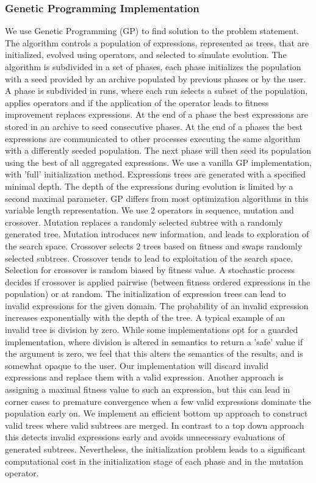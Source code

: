 \subsubsection{Genetic Programming Implementation}
We use Genetic Programming (GP) \cite{GP} to find solution to the problem statement. The algorithm controls a population of expressions, represented as trees, that are initialized, evolved using operators, and selected to simulate evolution.
The algorithm is subdivided in a set of phases, each phase initializes the population with a seed provided by an archive populated by previous phases or by the user. A phase is subdivided in runs, where each run selects a subset of the population, applies operators and if the application of the operator leads to fitness improvement replaces expressions. At the end of a phase the best expressions are stored in an archive to seed consecutive phases. At the end of a phases the best expressions are communicated to other processes executing the same algorithm with a differently seeded population. The next phase will then seed its population using the best of all aggregated expressions.
We use a vanilla GP implementation, with 'full' initialization method. Expressions trees are generated with a specified minimal depth. The depth of the expressions during evolution is limited by a second maximal parameter. GP differs from most optimization algorithms in this variable length representation. 
We use 2 operators in sequence, mutation and crossover. Mutation replaces a randomly selected subtree with a randomly generated tree. Mutation introduces new information, and leads to exploration of the search space. Crossover selects 2 trees based on fitness and swaps randomly selected subtrees. Crossover tends to lead to exploitation of the search space. Selection for crossover is random biased by fitness value. A stochastic process decides if crossover is applied pairwise (between fitness ordered expressions in the population) or at random.
The initialization of expression trees can lead to invalid expressions for the given domain. The probability of an invalid expression increases exponentially with the depth of the tree. A typical example of an invalid tree is division by zero. While some implementations opt for a guarded implementation, where division is altered in semantics to return a 'safe' value if the argument is zero, we feel that this alters the semantics of the results, and is somewhat opaque to the user. Our implementation will discard invalid expressions and replace them with a valid expression. Another approach is assigning a maximal fitness value to such an expression, but this can lead in corner cases to premature convergence when a few valid expressions dominate the population early on. We implement an efficient bottom up approach to construct valid trees where valid subtrees are merged. In contrast to a top down approach this detects invalid expressions early and avoids unnecessary evaluations of generated subtrees. Nevertheless, the initialization problem leads to a significant computational cost in the initialization stage of each phase and in the mutation operator.
